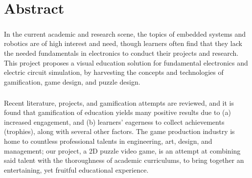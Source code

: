 \chapter*{Abstract}
\paragraph*{}
In the current academic and research scene, the topics of embedded systems and robotics are of high interest and need, though learners often find that they lack the needed fundamentals in electronics to conduct their projects and research. This project proposes a visual education solution for fundamental electronics and electric circuit simulation, by harvesting the concepts and technologies of gamification, game design, and puzzle design.

\paragraph*{}
Recent literature, projects, and gamification attempts are reviewed, and it is found that gamification of education yields many positive results due to (a) increased engagement, and (b) learners’ eagerness to collect achievements (trophies), along with several other factors. The game production industry is home to countless professional talents in engineering, art, design, and management; our project, a 2D puzzle video game, is an attempt at combining said talent with the thoroughness of academic curriculums, to bring together an entertaining, yet fruitful educational experience.